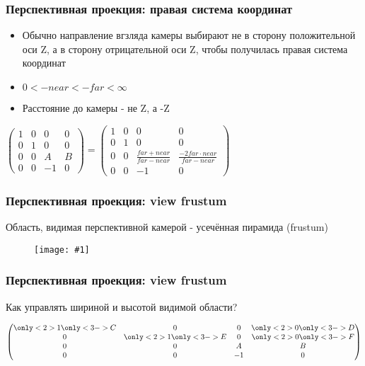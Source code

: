 \documentclass{beamer}
\newcommand{\slideimage}[1]{
  \begin{figure}
    \begin{adjustbox}{width=\textwidth, totalheight=\textheight-2\baselineskip-2\baselineskip,keepaspectratio}
      \texttt{[image: \#1]}
    \end{adjustbox}
  \end{figure}
}
\begin{document}
\begin{frame}[fragile]
\frametitle{Перспективная проекция: правая система координат}
\begin{itemize}
\item Обычно направление вгзляда камеры выбирают не в сторону положительной оси Z, а в сторону отрицательной оси Z, чтобы получилась правая система координат
\pause
\item \begin{math}0 < -near < -far < \infty\end{math}
\pause
\item Расстояние до камеры - не Z, а -Z
\end{itemize}
\pause
\begin{center}
\begin{math}
\begin{pmatrix}
1 & 0 & 0 & 0 \\
0 & 1 & 0 & 0 \\
0 & 0 & A & B \\
0 & 0 & -1 & 0
\end{pmatrix}
=
\begin{pmatrix}
1 & 0 & 0 & 0 \\
0 & 1 & 0 & 0 \\
0 & 0 & \frac{far + near}{far - near} & \frac{-2 far \cdot near}{far - near} \\
0 & 0 & -1 & 0
\end{pmatrix}
\end{math}
\end{center}
\end{frame}

\begin{frame}[fragile]
\frametitle{Перспективная проекция: view frustum}
Область, видимая перспективной камерой - усечённая пирамида (frustum)
\slideimage{frustum.png}
\end{frame}

\begin{frame}[fragile]
\frametitle{Перспективная проекция: view frustum}
Как управлять шириной и высотой видимой области?
\pause
\begin{center}
\begin{math}
\begin{pmatrix}
\only<2>{1}\only<3->{C} & 0 & 0 & \only<2>{0}\only<3->{D} \\
0 & \only<2>{1}\only<3->{E} & 0 & \only<2>{0}\only<3->{F} \\
0 & 0 & A & B \\
0 & 0 & -1 & 0
\end{pmatrix}
\end{math}
\end{center}
\end{frame}
\end{document}
